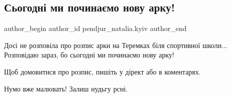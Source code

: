  
 
 
 
 

\subsection{Сьогодні ми починаємо нову арку!}
\label{sec:15_08_2023.fb.pendjur_natalia.kyiv.1.sjogodni_my_pochynajemo_novu_arku}

\ifcmt
 author_begin
   author_id pendjur_natalia.kyiv
 author_end
\fi

Досі не розповіла про розпис арки на Теремках біля спортивної школи...
Розповідаю зараз, бо сьогодні ми починаємо нову арку! 

Щоб домовитися про розпис, пишіть у дірект або в коментарях.

Нумо вже малювать! Залиш нудьгу рсні.
